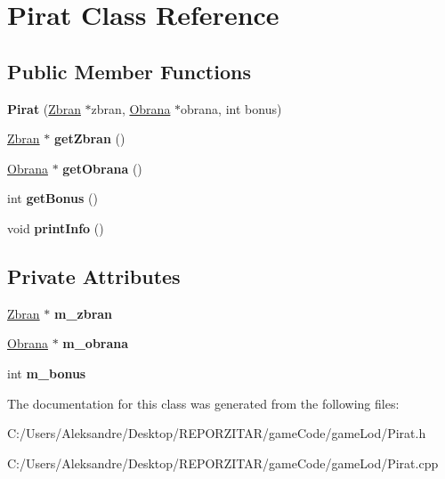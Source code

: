 \hypertarget{class_pirat}{}\section{Pirat Class Reference}
\label{class_pirat}
\subsection*{Public Member Functions}
\begin{DoxyCompactItemize}
\item 
\mbox{\label{class_pirat_a984abc4687cacd66dcb3843a600ff102}} 
{\bfseries Pirat} (\hyperlink{class_zbran}{Zbran} $\ast$zbran, \hyperlink{class_obrana}{Obrana} $\ast$obrana, int bonus)
\item 
\mbox{\label{class_pirat_a0e6ded24b8adfb2df2fb13e01b63e5cf}} 
\hyperlink{class_zbran}{Zbran} $\ast$ {\bfseries get\+Zbran} ()
\item 
\mbox{\label{class_pirat_ab7f68dad16acecfb6594ffd9447c9e0f}} 
\hyperlink{class_obrana}{Obrana} $\ast$ {\bfseries get\+Obrana} ()
\item 
\mbox{\label{class_pirat_a357e22f0319dfe378b3610ada463dfb5}} 
int {\bfseries get\+Bonus} ()
\item 
\mbox{\label{class_pirat_a0808ef7fc04b9d860afb05f9d77e514f}} 
void {\bfseries print\+Info} ()
\end{DoxyCompactItemize}
\subsection*{Private Attributes}
\begin{DoxyCompactItemize}
\item 
\mbox{\label{class_pirat_aee88b4cec2a7ede4e60d2687d70630bb}} 
\hyperlink{class_zbran}{Zbran} $\ast$ {\bfseries m\+\_\+zbran}
\item 
\mbox{\label{class_pirat_ad45cfa99580c4ee8a24092b94e73ac8e}} 
\hyperlink{class_obrana}{Obrana} $\ast$ {\bfseries m\+\_\+obrana}
\item 
\mbox{\label{class_pirat_aea6a34a2775e8928c3a968443bfee540}} 
int {\bfseries m\+\_\+bonus}
\end{DoxyCompactItemize}


The documentation for this class was generated from the following files\+:\begin{DoxyCompactItemize}
\item 
C\+:/\+Users/\+Aleksandre/\+Desktop/\+R\+E\+P\+O\+R\+Z\+I\+T\+A\+R/game\+Code/game\+Lod/Pirat.\+h\item 
C\+:/\+Users/\+Aleksandre/\+Desktop/\+R\+E\+P\+O\+R\+Z\+I\+T\+A\+R/game\+Code/game\+Lod/Pirat.\+cpp\end{DoxyCompactItemize}
